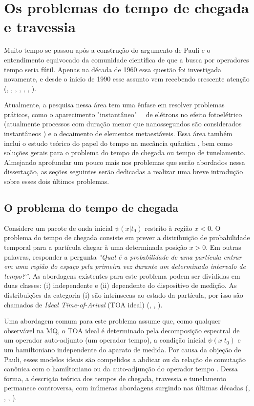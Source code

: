 \section{Os problemas do tempo de chegada e travessia}
\label{problems}

Muito tempo se passou após a construção do argumento de Pauli e o entendimento equivocado da comunidade científica de que a busca por operadores tempo seria fútil. Apenas na década de 1960 essa questão foi investigada novamente, e desde o inicio de 1990 esse assunto vem recebendo crescente atenção (\cite{arahabom}, \cite{allcock}, \cite{13}, \cite{MugaComplex}, \cite{halli}, \cite{livrotime1}, \cite{livrotime2}).


Atualmente, a pesquisa nessa área tem uma ênfase em resolver problemas práticos, como o aparecimento "instantâneo" $\text{ }$ de elétrons no efeito fotoelétrico (atualmente processos com duração menor que nanossegundos são considerados instantâneos  \cite{20}) e o decaimento de elementos metaestáveis. Essa área também inclui o estudo teórico do papel do tempo na mecância quântica  \cite{13}, bem como soluções gerais para o problema do tempo de chegada ou tempo de tunelamento. Almejando aprofundar um pouco mais nos problemas que serão abordados nessa dissertação, as seções seguintes serão dedicadas a realizar uma breve introdução sobre esses dois últimos problemas.


\subsection{O problema do tempo de chegada}
\label{arrival}

Considere um pacote de onda inicial $\psi (x|t_0)$ restrito à região $x < 0$. O problema do tempo de chegada consiste em prever a distribuição de probabilidade temporal para a partícula chegar à uma determinada posição $x > 0$. Em outras palavras, responder a pergunta \textit{"Qual é a probabilidade de uma partícula entrar em uma região do espaço pela primeira vez durante um determinado intervalo de tempo?”}. As abordagens existentes para este problema podem ser divididas em duas classes: (i) independente e (ii) dependente do dispositivo de medição. As distribuições da categoria (i) são intrínsecas ao estado da partícula, por isso são chamados de \textit{Ideal Time-of-Arival} (TOA ideal) (\cite{Delgado}, \cite{4}, \cite{Das2}). 

Uma abordagem comum para este problema assume que, como qualquer observável na MQ, o TOA ideal é determinado pela decomposição espectral de um operador auto-adjunto (um operador tempo), a condição inicial $\psi (x|t_0)$ e um hamiltoniano independente do aparato de medida. Por causa da objeção de Pauli, esses modelos ideais são compelidos a abdicar ou da relação de comutação canônica com o hamiltoniano ou da auto-adjunção do operador tempo \cite{livrotime1}. Dessa forma, a descrição teórica dos tempos de chegada, travessia e tunelamento permanece controversa, com inúmeras abordagens surgindo nas últimas décadas (\cite{allcock}, \cite{arahabom}, \cite{Ricardo}, \cite{when}).

